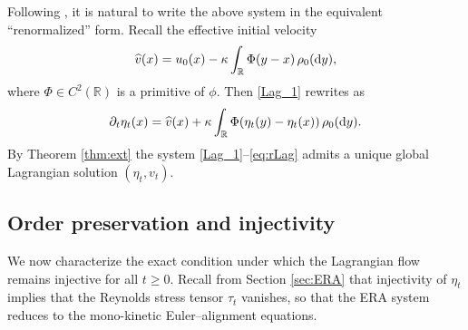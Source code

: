 \documentclass[10pt,reqno]{amsart}
\renewcommand{\ge}{\geqslant}
\numberwithin{equation}{section}
\newcommand{\R}{\mathbb R}
\newcommand{\bq}{\begin{equation}}
\newcommand{\eq}{\end{equation}}
\newcommand{\pa}{\partial}
\newcommand{\dy}{\textnormal{d}y}
\begin{document}
Following \cite{CCKTpre, CZ21, HKPZ19}, it is natural to write the above system in the equivalent ``renormalized'' form. Recall the effective initial velocity
\[
\widehat v(x) = u_0(x)-\kappa \int_\R \Phi(y-x)\,\rho_0(\dy),
\]
where $\Phi\in C^2(\R)$ is a primitive of $\phi$. Then \eqref{Lag_1} rewrites as
\bq\label{eq:rLag}
\pa_t \eta_t(x) = \widehat v(x) + \kappa \int_\R \Phi (\eta_t(y)-\eta_t(x))\,\rho_0(\dy).
\eq
By Theorem \ref{thm:ext} the system \eqref{Lag_1}--\eqref{eq:rLag} admits a unique global Lagrangian solution $(\eta_t,v_t)$.


\subsection{Order preservation and injectivity}

We now characterize the exact condition under which the Lagrangian flow remains injective for all $t\ge 0$. Recall from Section \ref{sec:ERA} that injectivity of $\eta_t$ implies that the Reynolds stress tensor $\tau_t$ vanishes, so that the ERA system reduces to the mono-kinetic Euler--alignment equations.  
\end{document}
